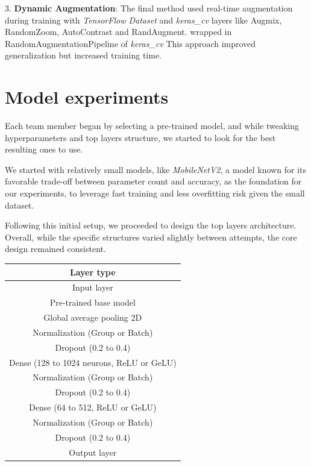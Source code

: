 \documentclass[11pt]{article}
\begin{document}
\begin{multicols}{2}
        3. \textbf{Dynamic Augmentation}: The final method used real-time augmentation during training with \textit{TensorFlow Dataset} and \textit{keras\_cv}\cite{keras2015} layers like Augmix\cite{hendrycks2019augmix}, RandomZoom, AutoContrast and RandAugment\cite{cubuk2019randaugment}. wrapped in RandomAugmentationPipeline of \textit{keras\_cv} This approach improved generalization but increased training time.
        

        
        
        \section{Model experiments}
        
        Each team member began by selecting a pre-trained model, and while tweaking hyperparameters and top layers structure, we started to look for the best resulting ones to use.
        
        We started with relatively small models, like \textit{MobileNetV2}, a model known for its favorable trade-off between parameter count and accuracy, as the foundation for our experiments, to leverage fast training and less overfitting risk given the small dataset.
        
        Following this initial setup, we proceeded to design the top layers architecture. 
        Overall, while the specific structures varied slightly between attempts, the core design remained consistent.
        
        \begin{table}[H]
            \centering
            \setlength{\tabcolsep}{5pt}
            \small
            \begin{tabular}{|c|}
                \hline
                \textbf{Layer type} \\ \hline
                Input layer \\ \hline
                Pre-trained base model \\ \hline
                Global average pooling 2D \\ \hline
                Normalization (Group or Batch) \\ \hline
                Dropout (0.2 to 0.4) \\ \hline
                Dense (128 to 1024 neurons, ReLU or GeLU) \\ \hline
                Normalization (Group or Batch) \\ \hline
                Dropout (0.2 to 0.4) \\ \hline
                Dense (64 to 512, ReLU or GeLU) \\ \hline
                Normalization (Group or Batch) \\ \hline
                Dropout (0.2 to 0.4) \\ \hline
                Output layer \\ \hline
            \end{tabular}
        \end{table}
        

\end{multicols}
\end{document}
